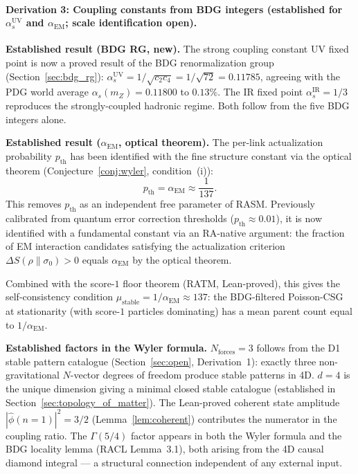 \documentclass[11pt,a4paper]{article}
\begin{document}
\paragraph{Derivation 3: Coupling constants from BDG integers (established for $\alpha_s^{\mathrm{UV}}$ and $\alpha_{\mathrm{EM}}$; scale identification open).}

\textbf{Established result (BDG RG, new).}
The strong coupling constant UV fixed point is now a proved result of the
BDG renormalization group (Section~\ref{sec:bdg_rg}):
$\alpha_s^{\mathrm{UV}} = 1/\sqrt{c_2 c_4} = 1/\sqrt{72} = 0.11785$,
agreeing with the PDG world average $\alpha_s(m_Z) = 0.11800$ to $0.13\%$.
The IR fixed point $\alpha_s^{\mathrm{IR}} = 1/3$ reproduces the
strongly-coupled hadronic regime. Both follow from the five BDG integers alone.

\textbf{Established result ($\alpha_{\mathrm{EM}}$, optical theorem).}
The per-link actualization probability $p_{\mathrm{th}}$ has been identified
with the fine structure constant via the optical theorem
(Conjecture~\ref{conj:wyler}, condition~(i)):
\begin{equation}
  p_{\mathrm{th}} = \alpha_{\mathrm{EM}} \approx \frac{1}{137}.
\end{equation}
This removes $p_{\mathrm{th}}$ as an independent free parameter of RASM.
Previously calibrated from quantum error correction thresholds ($p_{\mathrm{th}} \approx 0.01$),
it is now identified with a fundamental constant via an RA-native argument:
the fraction of EM interaction candidates satisfying the actualization
criterion $\Delta S(\rho\|\sigma_0) > 0$ equals $\alpha_{\mathrm{EM}}$ by
the optical theorem.

Combined with the score-$1$ floor theorem (RATM, Lean-proved),
this gives the self-consistency condition $\mu_{\mathrm{stable}} = 1/\alpha_{\mathrm{EM}} \approx 137$:
the BDG-filtered Poisson-CSG at stationarity (with score-$1$ particles
dominating) has a mean parent count equal to $1/\alpha_{\mathrm{EM}}$.

\textbf{Established factors in the Wyler formula.}
$N_{\mathrm{forces}} = 3$ follows from the D1 stable pattern catalogue
(Section~\ref{sec:open}, Derivation~1): exactly three non-gravitational
$N$-vector degrees of freedom produce stable patterns in 4D.
$d = 4$ is the unique dimension giving a minimal closed stable catalogue
(established in Section~\ref{sec:topology_of_matter}).
The Lean-proved coherent state amplitude $|\hat\phi(n{=}1)|^2 = 3/2$
(Lemma~\ref{lem:coherent}) contributes the numerator in the coupling ratio.
The $\Gamma(5/4)$ factor appears in both the Wyler formula and the BDG
locality lemma (RACL Lemma~3.1), both arising from the 4D causal diamond
integral — a structural connection independent of any external input.
\end{document}
